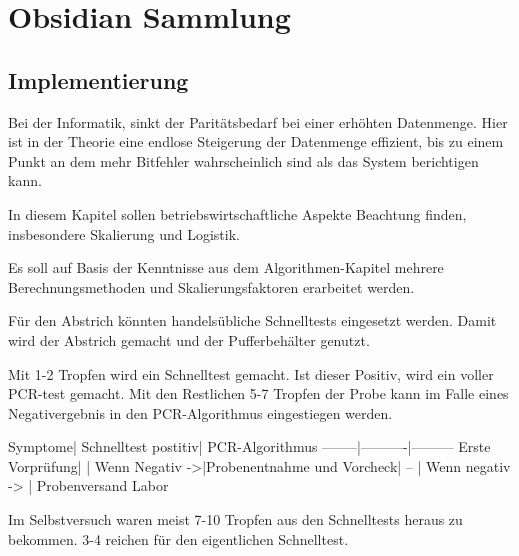 \section{Obsidian Sammlung}
\subsection{Implementierung}
Bei der Informatik, sinkt der Paritätsbedarf bei einer erhöhten Datenmenge.
Hier ist in der Theorie eine endlose Steigerung der Datenmenge effizient, bis zu einem Punkt an dem mehr Bitfehler wahrscheinlich sind als das System berichtigen kann.

In diesem Kapitel sollen betriebswirtschaftliche Aspekte Beachtung finden, insbesondere Skalierung und Logistik.

Es soll auf Basis der Kenntnisse aus dem Algorithmen-Kapitel mehrere Berechnungsmethoden und Skalierungsfaktoren erarbeitet werden.

Für den Abstrich könnten handelsübliche Schnelltests eingesetzt werden. Damit wird der Abstrich gemacht und der Pufferbehälter genutzt.

Mit 1-2 Tropfen wird ein Schnelltest gemacht. Ist dieser Positiv, wird ein voller PCR-test gemacht. Mit den Restlichen 5-7 Tropfen der Probe kann im Falle eines Negativergebnis in den PCR-Algorithmus eingestiegen werden.

Symptome| Schnelltest postitiv| PCR-Algorithmus
--------|----------|---------
Erste Vorprüfung| |
Wenn Negativ ->|Probenentnahme und Vorcheck|
-- | Wenn negativ -> | Probenversand Labor

Im Selbstversuch waren meist 7-10 Tropfen aus den Schnelltests heraus zu bekommen. 3-4 reichen für den eigentlichen Schnelltest.
\fi